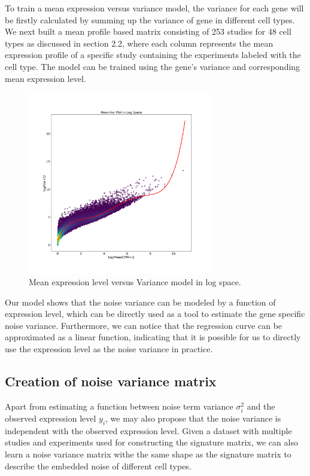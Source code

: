 \documentclass[10pt, a4paper, oneside]{article}
\begin{document}
To train a mean expression versus variance model, 
the variance for each gene will be firstly calculated by summing up the variance of gene in different cell types. 
We next built a mean profile based matrix consisting of 253 studies for 48 cell types as discussed in section 2.2, 
where each column represents the mean expression profile of a specific study containing the experiments labeled with the cell type. 
The model can be trained using the gene's variance and corresponding mean expression level. 

\begin{figure}
    \centering
    \includegraphics[width=8cm]{Var_Mean_model}
    \caption{Mean expression level versus Variance model in log space.}
    \label{fig1}
\end{figure}

Our model shows that the noise variance can be modeled by a function of expression level, which
can be directly used as a tool to estimate the gene specific noise variance. Furthermore, we can notice that
the regression curve can be approximated as a linear function, indicating that it is possible for us
to directly use the expression level as the noise variance in practice.

\subsection{Creation of noise variance matrix}
\justify
Apart from estimating a function between noise term variance $\sigma_i^2$ and the observed expression level $y_i$, we may also propose that
the noise variance is independent with the observed expression level. Given a dataset with multiple studies and experiments used for constructing
the signature matrix, we can also learn a noise variance matrix withe the same shape as the signature matrix to describe the embedded noise of different
cell types.
\end{document}
